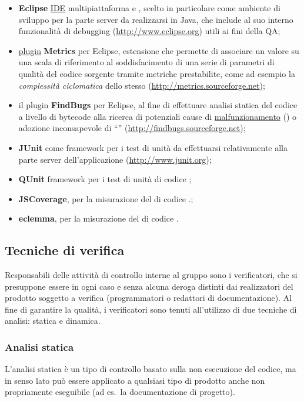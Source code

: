 {\begin{itemize}
  \item \textbf{Eclipse} \underline{IDE} multipiattaforma e , scelto in particolare come ambiente di sviluppo per la parte server da realizzarsi in Java, che include al suo interno funzionalità di debugging (\url{http://www.eclipse.org}) utili ai fini della QA;
  \item \underline{plugin} \textbf{Metrics} per Eclipse, estensione che permette di associare un valore su una scala di riferimento al soddisfacimento di una serie di parametri di qualità del codice sorgente tramite metriche prestabilite, come ad esempio la \textit{complessità ciclomatica} dello stesso (\url{http://metrics.sourceforge.net});
  \item il plugin \textbf{FindBugs} per Eclipse, al fine di effettuare analisi statica del codice a livello di bytecode alla ricerca di potenziali cause di \underline{malfunzionamento} () o adozione inconsapevole di ``'' (\url{http://findbugs.sourceforge.net});
  \item \textbf{JUnit} come framework per i test di unità da effettuarsi relativamente alla parte server dell'applicazione (\url{http://www.junit.org});
  \item \textbf{QUnit} framework per i test di unità di codice ; 
  \item \textbf{JSCoverage},  per la misurazione del  di codice .;
  \item \textbf{eclemma},  per la misurazione del  di codice . 

\end{itemize}

\subsection{Tecniche di verifica}
Responsabili delle attività di controllo interne al gruppo sono i verificatori, che si presuppone essere in ogni caso e senza alcuna deroga distinti dai realizzatori del prodotto soggetto a verifica (programmatori o redattori di documentazione). Al fine di garantire la qualità, i verificatori sono tenuti all'utilizzo di due tecniche di analisi: statica e dinamica.

\subsubsection{Analisi statica}
\label{analisi_statica}
L'analisi statica è un tipo di controllo basato sulla non esecuzione del codice, ma in senso lato può essere applicato a qualsiasi tipo di prodotto anche non propriamente eseguibile (ad es.~la documentazione di progetto).

}

